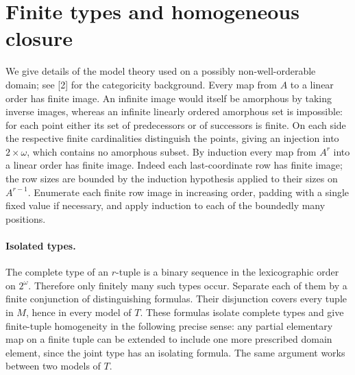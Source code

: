 \documentclass[11pt]{article}
\begin{document}
\section{Finite types and homogeneous closure}
We give details of the model theory used on a possibly non-well-orderable domain; see [2] for the categoricity background. Every map from $A$ to a linear order has finite image. An infinite image would itself be amorphous by taking inverse images, whereas an infinite linearly ordered amorphous set is impossible: for each point either its set of predecessors or of successors is finite. On each side the respective finite cardinalities distinguish the points, giving an injection into $2\times\omega$, which contains no amorphous subset. By induction every map from $A^r$ into a linear order has finite image. Indeed each last-coordinate row has finite image; the row sizes are bounded by the induction hypothesis applied to their sizes on $A^{r-1}$. Enumerate each finite row image in increasing order, padding with a single fixed value if necessary, and apply induction to each of the boundedly many positions.
\paragraph{Isolated types.} The complete type of an $r$-tuple is a binary sequence in the lexicographic order on $2^\omega$. Therefore only finitely many such types occur. Separate each of them by a finite conjunction of distinguishing formulas. Their disjunction covers every tuple in $M$, hence in every model of $T$. These formulas isolate complete types and give finite-tuple homogeneity in the following precise sense: any partial elementary map on a finite tuple can be extended to include one more prescribed domain element, since the joint type has an isolating formula. The same argument works between two models of $T$.
\end{document}
